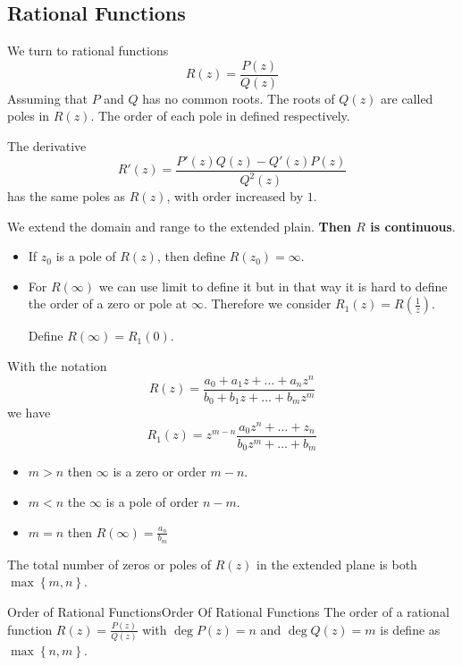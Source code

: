 \documentclass[../main.tex]{subfiles}
\begin{document}
\subsection{Rational Functions}
We turn to rational functions
\begin{equation}
R(z) = \frac{P(z)}{Q(z)}
\end{equation}
Assuming that $P$ and $Q$ has no common roots. The roots of $Q(z)$ are called poles in $R(z)$. The order of each pole in defined respectively.

The derivative 
\begin{equation*}
R'(z) = \frac{P'(z)Q(z)-Q'(z)P(z)}{Q^2(z)}
\end{equation*}
has the same poles as $R(z)$, with order increased by $1$.

We extend the domain and range to the extended plain. \textbf{Then $R$ is continuous}.
\begin{itemize}
\item If $z_0$ is a pole of $R(z)$, then define $R(z_0)= \infty $.
\item For $R(\infty )$ we can use limit to define it but in that way it is hard to define the order of a zero or pole at $\infty $. Therefore we consider $R_1(z) = R(\frac{1}{z})$. 

Define $R(\infty )=R_1(0)$.
\end{itemize}

With the notation 
\begin{equation*}
R(z) =\frac{a_0+a_1z+\ldots +a_nz^n}{b_0+b_1z+\ldots +b_mz^m}
\end{equation*}
we have
\begin{equation*}
R_1(z) = z^{m-n} \frac{a_0z^n+\ldots +z_n}{b_0z^m+\ldots +b_m}
\end{equation*}
\begin{itemize}
\item $m>n$ then $\infty $ is a zero or order $m-n$.
\item $m<n$ the $\infty $ is a pole of order $n-m$.
\item $m=n$ then $R(\infty ) = \frac{a_n}{b_m}$
\end{itemize}

The total number of zeros or poles of $R(z)$ in the extended plane is both $\max \left\{ m,n \right\}$.

\begin{definition}{Order of Rational Functions}{Order Of Rational Functions}
The  order of a rational function $\displaystyle R(z) = \frac{P(z)}{Q(z)}$ with $\deg P(z) = n$ and $\deg Q(z)=m$ is define as $\max \left\{ n,m \right\}$.
\end{definition}
\end{document}
